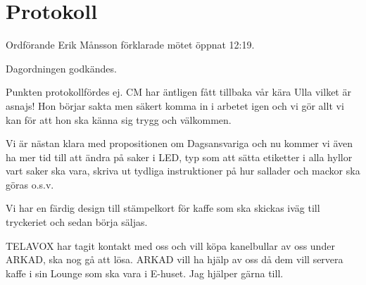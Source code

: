\documentclass[10pt]{article}
\def\mo{Erik Månsson}
\begin{document}
\section*{Protokoll}
\begin{paragrafer}
Ordförande {\mo} förklarade mötet öppnat 12:19.

{\valavmo}

{\valavms}

{\valavj}

{\tosg}

{\ingaadj}


Dagordningen godkändes.


\begin{fyllnadsval} %
\end{fyllnadsval}

\begin{paragrafer}
Punkten protokollfördes ej.
CM har äntligen fått tillbaka vår kära Ulla vilket är asnajs! Hon börjar sakta men säkert komma in i arbetet igen och vi gör allt vi kan för att hon ska känna sig trygg och välkommen.

Vi är nästan klara med propositionen om Dagsansvariga och nu kommer vi även ha mer tid till att ändra på saker i LED, typ som att sätta etiketter i alla hyllor vart saker ska vara, skriva ut tydliga instruktioner på hur sallader och mackor ska göras o.s.v.

Vi har en färdig design till stämpelkort för kaffe som ska skickas iväg till tryckeriet och sedan börja säljas.

TELAVOX har tagit kontakt med oss och vill köpa kanelbullar av oss under ARKAD, ska nog gå att lösa. ARKAD vill ha hjälp av oss då dem vill servera kaffe i sin Lounge som ska vara i E-huset. Jag hjälper gärna till.


\end{paragrafer}
\end{paragrafer}
\end{document}
